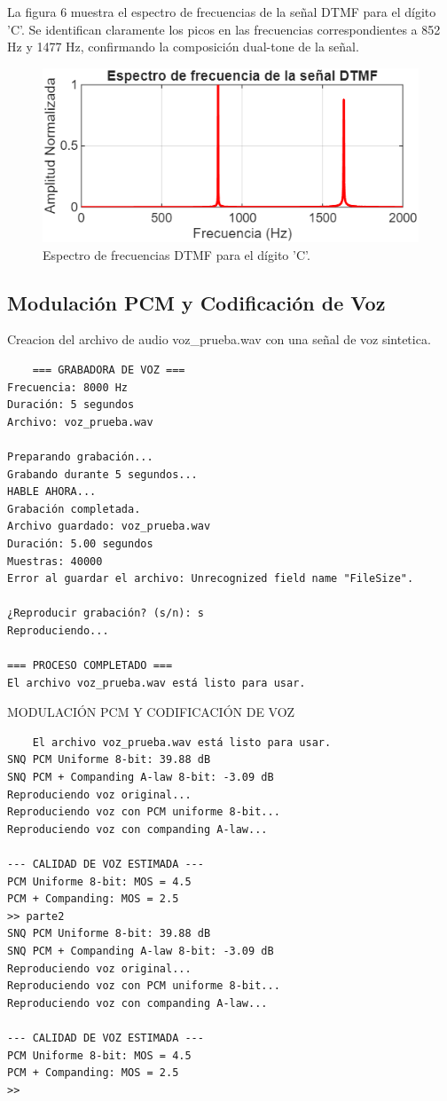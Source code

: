 \documentclass[journal]{IEEEtran} %
\begin{document}
La figura 6 muestra el espectro de frecuencias de la señal DTMF para el dígito 'C'. Se identifican claramente los picos en las frecuencias correspondientes a 852 Hz y 1477 Hz, confirmando la composición dual-tone de la señal.
\begin{figure}[H]
    \centerline{\includegraphics[width=0.8\columnwidth]{Figure_6.png}}
    \caption{Espectro de frecuencias DTMF para el dígito 'C'.}
    \label{fig} 
\end{figure}


\subsection{Modulación PCM y Codificación de Voz}
Creacion del archivo de audio voz\_prueba.wav con una señal de voz sintetica.
\begin{verbatim}
    === GRABADORA DE VOZ ===
Frecuencia: 8000 Hz
Duración: 5 segundos
Archivo: voz_prueba.wav

Preparando grabación...
Grabando durante 5 segundos...
HABLE AHORA...
Grabación completada.
Archivo guardado: voz_prueba.wav
Duración: 5.00 segundos
Muestras: 40000
Error al guardar el archivo: Unrecognized field name "FileSize".

¿Reproducir grabación? (s/n): s
Reproduciendo...

=== PROCESO COMPLETADO ===
El archivo voz_prueba.wav está listo para usar.

\end{verbatim}

MODULACIÓN PCM Y CODIFICACIÓN DE VOZ
\begin{verbatim}
    El archivo voz_prueba.wav está listo para usar.
SNQ PCM Uniforme 8-bit: 39.88 dB
SNQ PCM + Companding A-law 8-bit: -3.09 dB
Reproduciendo voz original...
Reproduciendo voz con PCM uniforme 8-bit...
Reproduciendo voz con companding A-law...

--- CALIDAD DE VOZ ESTIMADA ---
PCM Uniforme 8-bit: MOS = 4.5
PCM + Companding: MOS = 2.5
>> parte2
SNQ PCM Uniforme 8-bit: 39.88 dB
SNQ PCM + Companding A-law 8-bit: -3.09 dB
Reproduciendo voz original...
Reproduciendo voz con PCM uniforme 8-bit...
Reproduciendo voz con companding A-law...

--- CALIDAD DE VOZ ESTIMADA ---
PCM Uniforme 8-bit: MOS = 4.5
PCM + Companding: MOS = 2.5
>> 

\end{verbatim}
\end{document}
